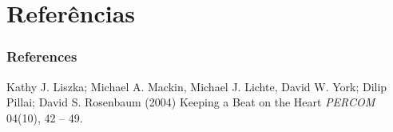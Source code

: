 \documentclass{beamer}
\begin{document}
\section{Referências}

\begin{frame}
\frametitle{References}
\footnotesize{
\begin{thebibliography}{99}
 Kathy J. Liszka; Michael A. Mackin, Michael J. Lichte, David W. York; Dilip Pillai; David S. Rosenbaum (2004)
\newblock Keeping a Beat on the Heart
\newblock \emph{PERCOM} 04(10), 42 -- 49.
\end{thebibliography}
}
\end{frame}



\begin{frame}
\titlepage %
\end{frame}

\end{document}

